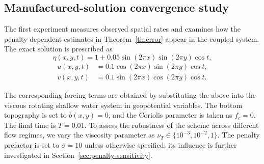 \documentclass[pdflatex,sn-mathphys-num]{sn-jnl}%
\theoremstyle{thmstyleone}%
\theoremstyle{thmstyletwo}%
\theoremstyle{thmstylethree}%
\begin{document}
\subsection{Manufactured-solution convergence study}
\label{sec:manufactured}

The first experiment measures observed spatial rates and examines how the penalty-dependent estimates in Theorem~\ref{th:error} appear in the coupled system. The exact solution is prescribed as
\begin{equation}
\label{eq:manufactured_eta}
\eta(x,y,t)=1+0.05\sin(2\pi x)\sin(2\pi y)\cos t,
\end{equation}
\begin{equation}
\label{eq:manufactured_u}
\begin{aligned}
u(x,y,t)&=0.1\cos(2\pi x)\sin(2\pi y)\cos t,\\
v(x,y,t)&=0.1\sin(2\pi x)\cos(2\pi y)\cos t.
\end{aligned}
\end{equation}

The corresponding forcing terms are obtained by substituting the above into the viscous rotating shallow water system in geopotential variables. The bottom topography is set to $b(x,y)=0$, and the Coriolis parameter is taken as $f_c=0$. The final time is $T=0.01$. To assess the robustness of the scheme across different flow regimes, we vary the viscosity parameter as $\nu_T \in \{10^{-3}, 10^{-2}, 1\}$. The penalty prefactor is set to $\sigma=10$ unless otherwise specified; its influence is further investigated in Section~\ref{sec:penalty-sensitivity}.
\end{document}
